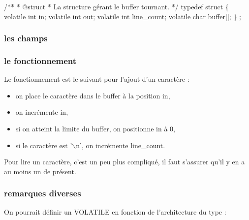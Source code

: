 \documentclass[10pt]{article}%
\begin{document}
\nwenddocs{}\endmoddef\nwstartdeflinemarkup{}\nwenddeflinemarkup
/**
 * @struct 
 * La structure gérant le buffer tournant.
 */
typedef struct \{
    volatile int in;
    volatile int out;
    volatile int line_count;
    volatile char buffer[];
\} ;
\eatline
{}\nwendcode{}\nwdocspar
\nwenddocs{}\nwdocspar
\subsubsection{les champs}

\subsubsection{le fonctionnement}
Le fonctionnement est le suivant pour l'ajout d'un caractère :

\begin{itemize}
  \item on place le caractère dans le buffer à la position {\Tt{}in\nwendquote},
  \item on incrémente {\Tt{}in\nwendquote},
  \item si on atteint la limite du buffer, on positionne {\Tt{}in\nwendquote} à 0,
  \item si le caractère est '$\backslash$n', on incrémente {\Tt{}line{\_}count\nwendquote}.
\end{itemize}

Pour lire un caractère, c'est un peu plus compliqué, il faut s'assurer qu'il y en a au moins un de présent.

\subsubsection{remarques diverses}
On pourrait définir un {\Tt{}VOLATILE\nwendquote} en fonction de l'architecture du type :
\end{document}
